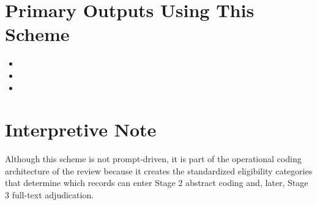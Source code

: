 \documentclass[11pt]{article}
\begin{document}
\section*{Primary Outputs Using This Scheme}
\begin{itemize}
\item {}
\item {}
\item {}
\end{itemize}

\section*{Interpretive Note}
Although this scheme is not prompt-driven, it is part of the operational coding architecture of the review because it creates the standardized eligibility categories that determine which records can enter Stage 2 abstract coding and, later, Stage 3 full-text adjudication.
\end{document}
